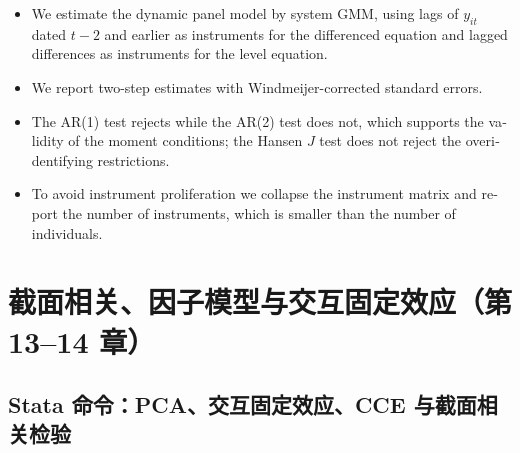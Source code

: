 \begin{english}
\begin{itemize}
  \item We estimate the dynamic panel model by system GMM, using lags of $y_{it}$ dated $t-2$ and earlier as instruments for the differenced equation and lagged differences as instruments for the level equation.
  \item We report two-step estimates with Windmeijer-corrected standard errors.
  \item The AR(1) test rejects while the AR(2) test does not, which supports the validity of the moment conditions; the Hansen $J$ test does not reject the overidentifying restrictions.
  \item To avoid instrument proliferation we collapse the instrument matrix and report the number of instruments, which is smaller than the number of individuals.
\end{itemize}
\end{english}

\section{截面相关、因子模型与交互固定效应（第 13–14 章）}\label{sec:UappB-factor}

\subsection{Stata 命令：PCA、交互固定效应、CCE 与截面相关检验}

